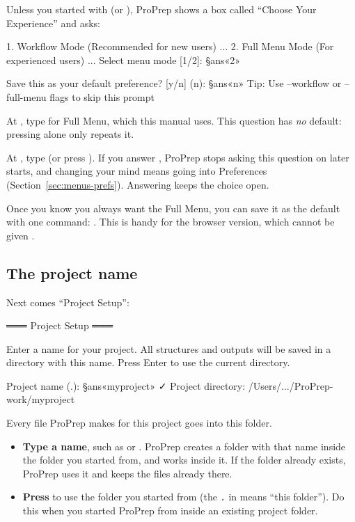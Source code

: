 Unless you started with  (or ), ProPrep
shows a box called ``Choose Your Experience'' and asks:

\begin{screen}
 1. Workflow Mode (Recommended for new users)
 ...
 2. Full Menu Mode (For experienced users)
 ...
Select menu mode  [1/2]: §ans«2»

Save this as your default preference?  [y/n] (n): §ans«n»
Tip: Use --workflow or --full-menu flags to skip this prompt
\end{screen}

\begin{steps}
  \item At , type  for Full Menu, which
  this manual uses. This question has \emph{no} default: pressing 
  alone only repeats it.
  \item At , type  (or
  press ). If you answer , ProPrep stops asking this question
  on later starts, and changing your mind means going into Preferences
  (Section~\ref{sec:menus-prefs}). Answering  keeps the choice open.
\end{steps}

\begin{tip}
Once you know you always want the Full Menu, you can save it as the default
with one command: . This is handy for
the browser version, which cannot be given .
\end{tip}

\subsection*{The project name}

Next comes ``Project Setup'':

\begin{screen}
═══ Project Setup ═══

Enter a name for your project. All structures and outputs
will be saved in a directory with this name.
Press Enter to use the current directory.

Project name (.): §ans«myproject»
✓ Project directory: /Users/.../ProPrep-work/myproject
\end{screen}

Every file ProPrep makes for this project goes into this folder.

\begin{itemize}
  \item \textbf{Type a name}, such as  or .
  ProPrep creates a folder with that name inside the folder you started from,
  and works inside it. If the folder already exists, ProPrep uses it and keeps
  the files already there.
  \item \textbf{Press } to use the folder you started from (the
  \texttt{.} in  means ``this folder''). Do this when you started
  ProPrep from inside an existing project folder.
\end{itemize}

